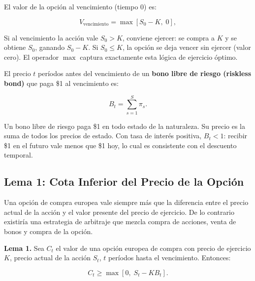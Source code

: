 \documentclass[12pt]{article}
\begin{document}
El valor de la opci\'on al vencimiento (tiempo 0) es:

\begin{equation}
  V_{\text{vencimiento}} = \max[S_0 - K,\; 0],
\end{equation}

\begin{intuicionmat}
Si al vencimiento la acci\'on vale $S_0 > K$, conviene ejercer: se compra a $K$ y se obtiene $S_0$, ganando $S_0 - K$. Si $S_0 \leq K$, la opci\'on se deja vencer sin ejercer (valor cero). El operador $\max$ captura exactamente esta l\'ogica de ejercicio \'optimo.
\end{intuicionmat}

El precio $t$ per\'iodos antes del vencimiento de un \textbf{bono libre de riesgo (riskless bond)} que paga \$1 al vencimiento es:

\begin{equation}
  B_t = \sum_{s=1}^{S} \pi_s.
\end{equation}

\begin{intuicionmat}
Un bono libre de riesgo paga \$1 en todo estado de la naturaleza. Su precio es la suma de todos los precios de estado. Con tasa de inter\'es positiva, $B_t < 1$: recibir \$1 en el futuro vale menos que \$1 hoy, lo cual es consistente con el descuento temporal.
\end{intuicionmat}

\subsection{Lema 1: Cota Inferior del Precio de la Opci\'on}

\begin{intuicion}
Una opci\'on de compra europea vale siempre m\'as que la diferencia entre el precio actual de la acci\'on y el valor presente del precio de ejercicio. De lo contrario existir\'ia una estrategia de arbitraje que mezcla compra de acciones, venta de bonos y compra de la opci\'on.
\end{intuicion}

\textbf{Lema 1.} Sea $C_t$ el valor de una opci\'on europea de compra con precio de ejercicio $K$, precio actual de la acci\'on $S_t$, $t$ per\'iodos hasta el vencimiento. Entonces:

\begin{equation}
  C_t \geq \max[0,\; S_t - KB_t].
  \label{eq:lema1}
\end{equation}
\end{document}
